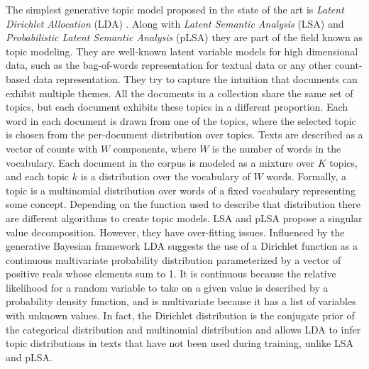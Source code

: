 The simplest generative topic model proposed in the state of the art is \textit{Latent Dirichlet Allocation} (LDA) \citep{Blei2003}. Along with \textit{Latent Semantic Analysis} (LSA) \citep{Deerwester1990} and \textit{Probabilistic Latent Semantic Analysis} (pLSA) \citep{Hofmann2001}  they are part of the field known as topic modeling. They are well-known latent variable models for high dimensional data, such as the bag-of-words representation for textual data or any other count-based data representation. They try to capture the intuition that documents can exhibit multiple themes. All the documents in a collection share the same set of topics, but each document exhibits these topics in a different proportion. Each word in each document is drawn from one of the topics, where the selected topic is chosen from the per-document distribution over topics.  Texts are described as a vector of counts with $W$ components, where $W$ is the number of words in the vocabulary. Each document in the corpus is modeled as a mixture over $K$ topics, and each topic $k$ is a distribution over the vocabulary of $W$ words. Formally, a topic is a multinomial distribution over words of a fixed vocabulary representing some concept. Depending on the function used to describe that distribution there are different algorithms to create topic models. LSA and pLSA propose a singular value decomposition. However, they have over-fitting issues. Influenced by the generative Bayesian framework LDA suggests the use of a Dirichlet function as a continuous multivariate probability distribution parameterized by a vector of positive reals whose elements sum to 1.  It is continuous because the relative likelihood for a random variable to take on a given value is described by a probability density function, and is multivariate because it has a list of variables with unknown values. In fact, the Dirichlet distribution is the conjugate prior of the categorical distribution and multinomial distribution and allows LDA to infer topic distributions in texts that have not been used during training, unlike LSA and pLSA.

